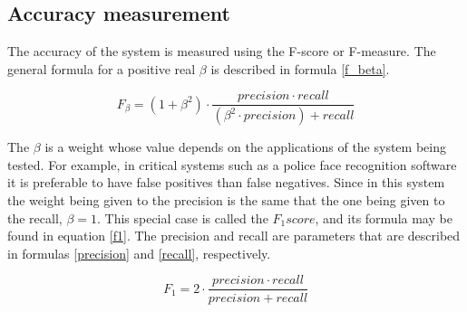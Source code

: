 
		\subsection{Accuracy measurement}
		\label{accuracy_measurement}

		The accuracy of the system is measured using the F-score or F-measure. 
		The general formula for a positive real $\beta$ is described in formula \ref{f_beta}. 
		\begin{center}
		\begin{equation}
		\label{f_beta}
		F_\beta=(1+\beta^2)\cdot\frac{precision \cdot recall}{(\beta^2 \cdot precision )+recall}
		\end{equation}
		\end{center}

		The $\beta$ is a weight whose value depends on the applications of the system being tested. 
		For example, in critical systems such as a police face recognition software it is preferable to have false positives than false negatives.
		Since in this system the weight being given to the precision is the same that the one being given to the recall, $\beta=1$. 
		This special case is called the $F_1 score$, and its formula may be found in equation \ref{f1}.
		The precision and recall are parameters that are described in formulas \ref{precision} and \ref{recall}, respectively. 
	
		
		\begin{center}
		\begin{equation}
		F_1=2\cdot\frac{precision \cdot recall}{precision + recall}
		\label{f1}
		\end{equation}
		\end{center}

